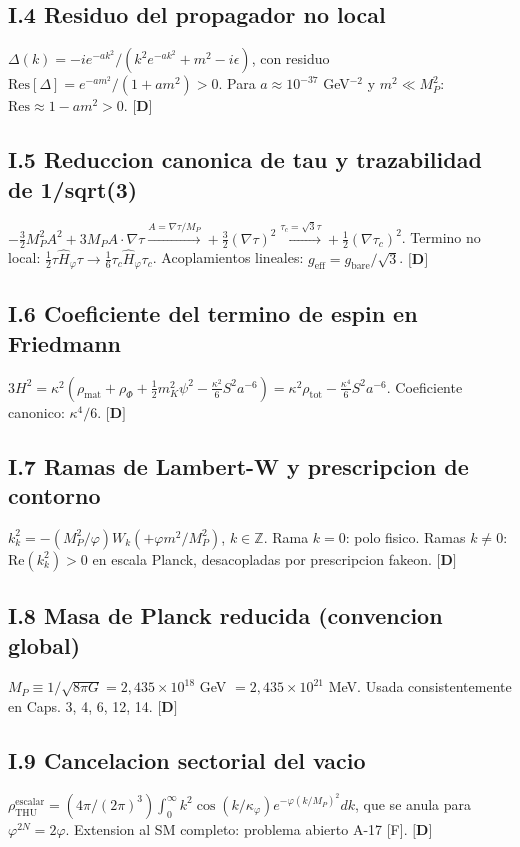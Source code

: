 ﻿\documentclass[11pt,letterpaper]{article}
\begin{document}
\subsection{I.4 Residuo del propagador no local}
$\Delta(k) = -i e^{-ak^2}/(k^2 e^{-ak^2} + m^2 - i\epsilon)$, con residuo $\mathrm{Res}[\Delta] = e^{-am^2}/(1+am^2) > 0$. Para $a \approx 10^{-37}$ GeV$^{-2}$ y $m^2 \ll M_P^2$: $\mathrm{Res} \approx 1 - am^2 > 0$. $\textbf{[D]}$
\subsection{I.5 Reduccion canonica de tau y trazabilidad de 1/sqrt(3)}
$-\tfrac{3}{2}M_P^2 A^2 + 3M_P A \cdot \nabla\tau \xrightarrow{A=\nabla\tau/M_P} +\tfrac{3}{2}(\nabla\tau)^2 \xrightarrow{\tau_c=\sqrt{3}\tau} +\tfrac{1}{2}(\nabla\tau_c)^2$. Termino no local: $\tfrac{1}{2}\tau\hat{H}_\varphi\tau \to \tfrac{1}{6}\tau_c\hat{H}_\varphi\tau_c$. Acoplamientos lineales: $g_{\mathrm{eff}} = g_{\mathrm{bare}}/\sqrt{3}$. $\textbf{[D]}$
\subsection{I.6 Coeficiente del termino de espin en Friedmann}
$3H^2 = \kappa^2(\rho_{\mathrm{mat}} + \rho_\Phi + \tfrac{1}{2}m_K^2\psi^2 - \tfrac{\kappa^2}{6}S^2 a^{-6}) = \kappa^2\rho_{\mathrm{tot}} - \tfrac{\kappa^4}{6}S^2 a^{-6}$. Coeficiente canonico: $\kappa^4/6$. $\textbf{[D]}$
\subsection{I.7 Ramas de Lambert-W y prescripcion de contorno}
$k_k^2 = -(M_P^2/\varphi)W_k(+\varphi m^2/M_P^2)$, $k \in \mathbb{Z}$. Rama $k=0$: polo fisico. Ramas $k \neq 0$: $\mathrm{Re}(k_k^2) > 0$ en escala Planck, desacopladas por prescripcion fakeon. $\textbf{[D]}$
\subsection{I.8 Masa de Planck reducida (convencion global)}
$M_P \equiv 1/\sqrt{8\pi G} = 2{,}435 \times 10^{18}$ GeV $= 2{,}435 \times 10^{21}$ MeV. Usada consistentemente en Caps. 3, 4, 6, 12, 14. $\textbf{[D]}$
\subsection{I.9 Cancelacion sectorial del vacio}
$\rho_{\mathrm{THU}}^{\mathrm{escalar}} = (4\pi/(2\pi)^3)\int_0^\infty k^2 \cos(k/\kappa_\varphi) e^{-\varphi(k/M_P)^2} dk$, que se anula para $\varphi^{2N} = 2\varphi$. Extension al SM completo: problema abierto A-17 [F]. $\textbf{[D]}$
\end{document}
